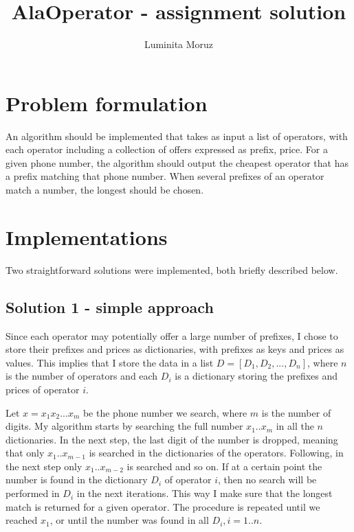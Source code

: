 \documentclass[12pt]{article}
\title{{\bf AlaOperator - assignment solution}}
\author{
Luminita Moruz  \\
}
\begin{document}
\maketitle

\section{Problem formulation}
\label{sec:problem}
An algorithm should be implemented that takes as input a list of
operators, with each operator including a collection of offers
expressed as prefix, price. For a given phone number, the algorithm
should output the cheapest operator that has a prefix matching that
phone number.  When several prefixes of an operator match a number,
the longest should be chosen.
 
\section{Implementations}
Two straightforward solutions were implemented, both briefly described
below.

\subsection{Solution 1 - simple approach}
Since each operator may potentially offer a large number of prefixes,
I chose to store their prefixes and prices as dictionaries, with
prefixes as keys and prices as values. This implies that I store the
data in a list $D = [D_1, D_2, ..., D_n]$, where $n$ is the number of
operators and each $D_i$ is a dictionary storing the prefixes and
prices of operator $i$.

\vspace{0.2cm}

Let $x=x_1 x_2 ... x_m$ be the phone number we search, where $m$ is
the number of digits. My algorithm starts by searching the full number
$x_1 .. x_m$ in all the $n$ dictionaries. In the next step, the last
digit of the number is dropped, meaning that only $x_1 .. x_{m-1}$ is
searched in the dictionaries of the operators. Following, in the next
step only $x_1 .. x_{m-2}$ is searched and so on. If at a certain
point the number is found in the dictionary $D_i$ of operator $i$,
then no search will be performed in $D_i$ in the next iterations. This
way I make sure that the longest match is returned for a given
operator. The procedure is repeated until we reached $x_1$, or until
the number was found in all $D_i, i=1..n$.
\end{document}
